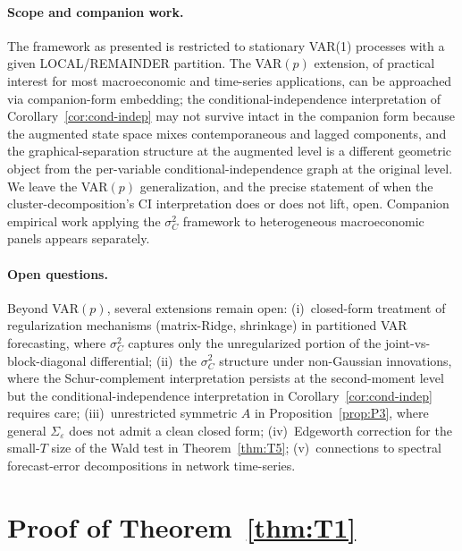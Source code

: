 \documentclass[11pt,letterpaper]{article}
\theoremstyle{remark}
\begin{document}
\paragraph{Scope and companion work.} The framework as presented is restricted to stationary VAR(1) processes with a given LOCAL/REMAINDER partition. The VAR$(p)$ extension, of practical interest for most macroeconomic and time-series applications, can be approached via companion-form embedding; the conditional-independence interpretation of Corollary~\ref{cor:cond-indep} may not survive intact in the companion form because the augmented state space mixes contemporaneous and lagged components, and the graphical-separation structure at the augmented level is a different geometric object from the per-variable conditional-independence graph at the original level. We leave the VAR$(p)$ generalization, and the precise statement of when the cluster-decomposition's CI interpretation does or does not lift, open. Companion empirical work applying the $\sigma^2_C$ framework to heterogeneous macroeconomic panels appears separately.

\paragraph{Open questions.} Beyond VAR$(p)$, several extensions remain open: (i)~closed-form treatment of regularization mechanisms (matrix-Ridge, shrinkage) in partitioned VAR forecasting, where $\sigma^2_C$ captures only the unregularized portion of the joint-vs-block-diagonal differential; (ii)~the $\sigma^2_C$ structure under non-Gaussian innovations, where the Schur-complement interpretation persists at the second-moment level but the conditional-independence interpretation in Corollary~\ref{cor:cond-indep} requires care; (iii)~unrestricted symmetric $A$ in Proposition~\ref{prop:P3}, where general $\Sigma_\varepsilon$ does not admit a clean closed form; (iv)~Edgeworth correction for the small-$T$ size of the Wald test in Theorem~\ref{thm:T5}; (v)~connections to spectral forecast-error decompositions in network time-series.

\appendix

\section{Proof of Theorem~\ref{thm:T1}}\label{app:A}
\end{document}
